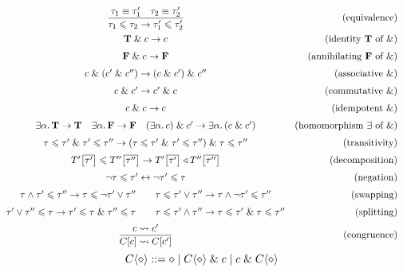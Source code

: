 $$ \renewcommand\arraystretch{1.5} \begin{array}{cr}
\dfrac{\tau_1 \equiv \tau_1' \quad \tau_2 \equiv \tau_2'}{\tau_1 \sub \tau_2 \to \tau_1' \sub \tau_2'} 
& \text{(equivalence)}
\\[4pt]
\tru \und c \to c 
& \text{(identity $\tru$ of $\undsym$)}
\\
\fals \und c \to \fals
& \text{(annihilating $\fals$ of $\undsym$)}
\\
c \und (c' \und c'') \to (c \und c') \und c'' 
& \text{(associative $\undsym$)}
\\
c \und c' \to c' \und c
& \text{(commutative $\undsym$)}
\\
c \und c \to c
& \text{(idempotent $\undsym$)}
\\
\exists \alpha \ldotp \tru \to \tru 
\quad
\exists \alpha \ldotp \fals \to \fals
\quad
(\exists \alpha \ldotp c) \und c' \to \exists \alpha \ldotp (c \und c')
& \text{(homomorphism $\exists$ of $\undsym$)}
\\
\tau \sub \tau' \und \tau' \sub \tau'' \to (\tau \sub \tau' \und \tau' \sub \tau'') \und \tau \sub \tau'' 
& \text{(transitivity)}
\\
T'\left[\overline {\tau'}\right] \sub T''\left[\overline {\tau''}\right] 
\to T'\left[\overline {\tau'}\right] \triangleleft T''\left[\overline {\tau''}\right]
& \text{(decomposition)}
\\
\comp \tau \sub \tau' \leftrightarrow \comp \tau' \sub \tau 
& \text{(negation)}
\\
\tau \meet \tau' \sub \tau'' \to \tau \sub \comp \tau' \join \tau''
\qquad
\tau \sub \tau' \join \tau'' \to \tau \meet \comp \tau' \sub \tau''
& \text{(swapping)}
\\
\tau' \join \tau'' \sub \tau \to \tau' \sub \tau \und \tau'' \sub \tau
\qquad
\tau \sub \tau' \meet \tau'' \to \tau \sub \tau' \und \tau \sub \tau''
& \text{(splitting)} 
\\[4pt]
\dfrac{c \step c'}{C[c] \step C[c']}
& \text{(congruence)} 
\\
\end{array} $$
$$ \solvectx ::= \ctxhole \mid \solvectx \und c \mid c \und \solvectx $$
